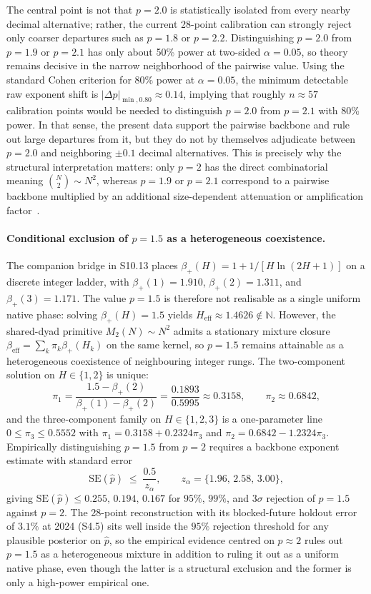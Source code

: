 \documentclass[11pt]{article}
\begin{document}
The central point is not that $p=2.0$ is statistically isolated from
every nearby decimal alternative; rather, the current 28-point calibration
can strongly reject only coarser departures such as $p=1.8$ or $p=2.2$.
Distinguishing $p=2.0$ from $p=1.9$ or $p=2.1$ has only about
50\% power at two-sided $\alpha=0.05$, so theory remains decisive in
the narrow neighborhood of the pairwise value. Using the standard Cohen
criterion for 80\% power at $\alpha=0.05$, the minimum detectable raw
exponent shift is $|\Delta p|_{\min,0.80}\approx 0.14$, implying that
roughly $n\approx 57$ calibration points would be needed to distinguish
$p=2.0$ from $p=2.1$ with 80\% power. In that sense, the present data
support the pairwise backbone and rule out large departures from it, but
they do not by themselves adjudicate between $p=2.0$ and neighboring
$\pm 0.1$ decimal alternatives. This is precisely why the structural
interpretation matters: only $p=2$ has the direct combinatorial meaning
$\binom{N}{2}\sim N^2$, whereas $p=1.9$ or $p=2.1$ correspond to a
pairwise backbone multiplied by an additional size-dependent attenuation or
amplification factor~\cite{Cohen1988}.

\paragraph{Conditional exclusion of $p=1.5$ as a heterogeneous coexistence.}
The companion bridge in S10.13 places $\beta_+(H)=1+1/[H\ln(2H{+}1)]$ on a discrete integer ladder, with $\beta_+(1)=1.910$, $\beta_+(2)=1.311$, and $\beta_+(3)=1.171$.  The value $p=1.5$ is therefore not realisable as a single uniform native phase: solving $\beta_+(H)=1.5$ yields $H_{\mathrm{eff}}\approx 1.4626\notin\mathbb{N}$.  However, the shared-dyad primitive $M_2(N)\sim N^2$ admits a stationary mixture closure $\beta_{\mathrm{eff}}=\sum_k\pi_k\beta_+(H_k)$ on the same kernel, so $p=1.5$ remains attainable as a heterogeneous coexistence of neighbouring integer rungs.  The two-component solution on $H\in\{1,2\}$ is unique:
\[
\pi_1=\frac{1.5-\beta_+(2)}{\beta_+(1)-\beta_+(2)}=\frac{0.1893}{0.5995}\approx 0.3158,
\qquad
\pi_2\approx 0.6842,
\]
and the three-component family on $H\in\{1,2,3\}$ is a one-parameter line $0\le\pi_3\le 0.5552$ with $\pi_1=0.3158+0.2324\pi_3$ and $\pi_2=0.6842-1.2324\pi_3$.  Empirically distinguishing $p=1.5$ from $p=2$ requires a backbone exponent estimate with standard error
\[
\mathrm{SE}(\hat p)\;\le\;\frac{0.5}{z_\alpha},\qquad z_\alpha=\{1.96,\,2.58,\,3.00\},
\]
giving $\mathrm{SE}(\hat p)\le 0.255,\,0.194,\,0.167$ for $95\%$, $99\%$, and $3\sigma$ rejection of $p=1.5$ against $p=2$.  The 28-point reconstruction with its blocked-future holdout error of $3.1\%$ at 2024 (S4.5) sits well inside the $95\%$ rejection threshold for any plausible posterior on $\hat p$, so the empirical evidence centred on $p\approx 2$ rules out $p=1.5$ as a heterogeneous mixture in addition to ruling it out as a uniform native phase, even though the latter is a structural exclusion and the former is only a high-power empirical one.
\end{document}

